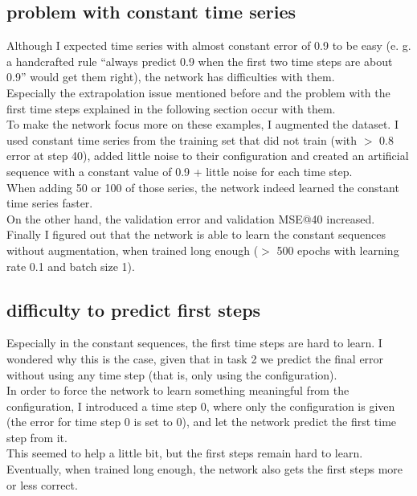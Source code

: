 \documentclass[a4paper,10pt]{article}
\begin{document}
\subsection{problem with constant time series}

Although I expected time series with almost constant error of 0.9 to be easy
(e. g. a handcrafted rule ``always predict 0.9 when the first two time steps are about 0.9'' would get them right),
the network has difficulties with them.\\
Especially the extrapolation issue mentioned before and the problem with the first time steps explained in the following section
occur with them.\\
To make the network focus more on these examples, I augmented the dataset.
I used constant time series from the training set that did not train (with $>$ 0.8 error at step 40),
added little noise to their configuration and created an artificial sequence with a constant value of 0.9 + little noise for each time step.\\
When adding 50 or 100 of those series, the network indeed learned the constant time series faster.\\
On the other hand, the validation error and validation MSE@40 increased.\\
Finally I figured out that the network is able to learn the constant sequences without augmentation, when trained long enough
($>$ 500 epochs with learning rate 0.1 and batch size 1).

\subsection{difficulty to predict first steps}

Especially in the constant sequences, the first time steps are hard to learn.
I wondered why this is the case, given that in task 2 we predict the final
error without using any time step (that is, only using the configuration).\\
In order to force the network to learn something meaningful from the configuration,
I introduced a time step 0, where only the configuration is given (the error for time step 0 is set to 0),
and let the network predict the first time step from it.\\
This seemed to help a little bit, but the first steps remain hard to learn.\\
Eventually, when trained long enough, the network also gets the first steps more or less correct.
\end{document}
